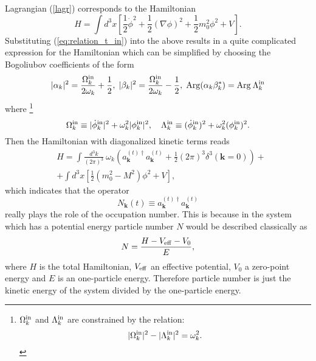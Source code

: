 \documentclass[twocolumn,showpacs,preprintnumbers,amsmath,amssymb,nofootinbib,superscriptaddress,prc]{revtex4}
\begin{document}
Lagrangian (\ref{lagr}) corresponds to the Hamiltonian
\begin{equation}
H = \int d^3x\left[\frac{1}{2}\dot{\phi}^2
  +\frac{1}{2}(\nabla\phi)^2+\frac{1}{2}m_0^2\phi^2+V\right].
\end{equation}
Substituting (\ref{eq:relation_t_in}) into the above results in a quite complicated expression for the Hamiltonian which can be simplified by choosing the Bogoliubov coefficients of the form
\begin{equation}
 |\alpha_k|^2=\frac{\Omega_k^{\rm in}}{2\omega_k}+\frac{1}{2}, \hspace{0.1cm}
 |\beta_k|^2=\frac{\Omega_k^{\rm in}}{2\omega_k}-\frac{1}{2}, \hspace{0.1cm}
 {\rm Arg}(\alpha_k \beta_k^*) = {\rm Arg} \: \Lambda_k^{\rm in}
 \label{eq:BCs_concrete_form}
\end{equation}
where \footnote{$\Omega_k^{\rm in}$ and $\Lambda_k^{\rm in}$ are constrained by the relation: 
\begin{equation}
\nonumber |\Omega_k^{\rm in}|^2-|\Lambda_k^{\rm in}|^2=\omega_k^2.
\end{equation} 
}
\begin{equation}
 \Omega_k^{\rm in}\equiv|\dot{\phi}_k^{\rm in}|^2+\omega_k^2|\phi_k^{\rm in}|^2,
  \quad \Lambda_k^{\rm in}\equiv(\dot{\phi}_k^{\rm in})^2+\omega_k^2(\phi_k^{\rm in})^2. \label{eq:Omega_Lambda}
\end{equation}
Then the Hamiltonian with diagonalized kinetic terms reads
\begin{eqnarray}
& H = \int\frac{d^3k}{(2\pi)^3}\:\omega_k\left(
  a_{\mathbf{k}}^{(t)\dagger}a_{\mathbf{k}}^{(t)}+\frac{1}{2} (2\pi)^3\delta^3(\mathbf{k}=0)\right) + \\
  & \nonumber  + \int d^3x \left[\frac{1}{2}(m_0^2-M^2)\phi^2+V\right], \label{eq:Hamiltonian_interacted2}
\end{eqnarray}
which indicates that the operator
\begin{equation}
 N_{\mathbf{k}}(t)\equiv a_{\mathbf{k}}^{(t)\dagger}a_{\mathbf{k}}^{(t)} \label{eq:number_op_real_scalar}
\end{equation}
really plays the role of the occupation number. This is because in the system which has a potential energy particle number $N$ would be described classically as
\begin{equation}
N = \frac{H - V_{\rm eff} - V_0}{E},
\end{equation}
where $H$ is the total Hamiltonian, $V_{\rm eff}$ an effective potential, $V_0$ a zero-point energy and $E$ is an one-particle energy. Therefore particle number is just the kinetic energy of the system divided by the one-particle energy.
\end{document}

